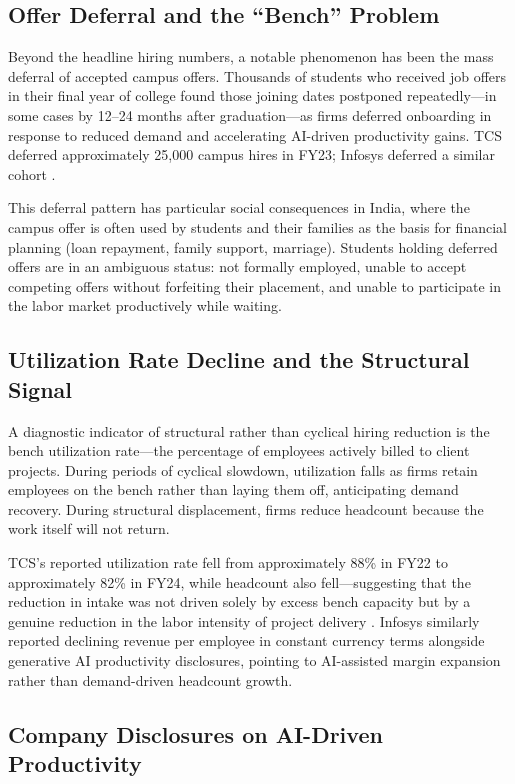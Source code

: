 \documentclass[conference]{IEEEtran}
\begin{document}
\subsection{Offer Deferral and the ``Bench'' Problem}

Beyond the headline hiring numbers, a notable phenomenon has been the mass deferral of accepted campus offers. Thousands of students who received job offers in their final year of college found those joining dates postponed repeatedly---in some cases by 12--24 months after graduation---as firms deferred onboarding in response to reduced demand and accelerating AI-driven productivity gains. TCS deferred approximately 25,000 campus hires in FY23; Infosys deferred a similar cohort \cite{mint2023offers}.

This deferral pattern has particular social consequences in India, where the campus offer is often used by students and their families as the basis for financial planning (loan repayment, family support, marriage). Students holding deferred offers are in an ambiguous status: not formally employed, unable to accept competing offers without forfeiting their placement, and unable to participate in the labor market productively while waiting.

\subsection{Utilization Rate Decline and the Structural Signal}

A diagnostic indicator of structural rather than cyclical hiring reduction is the bench utilization rate---the percentage of employees actively billed to client projects. During periods of cyclical slowdown, utilization falls as firms retain employees on the bench rather than laying them off, anticipating demand recovery. During structural displacement, firms reduce headcount because the work itself will not return.

TCS's reported utilization rate fell from approximately 88\% in FY22 to approximately 82\% in FY24, while headcount also fell---suggesting that the reduction in intake was not driven solely by excess bench capacity but by a genuine reduction in the labor intensity of project delivery \cite{tcs2024annual}. Infosys similarly reported declining revenue per employee in constant currency terms alongside generative AI productivity disclosures, pointing to AI-assisted margin expansion rather than demand-driven headcount growth.

\subsection{Company Disclosures on AI-Driven Productivity}
\end{document}
